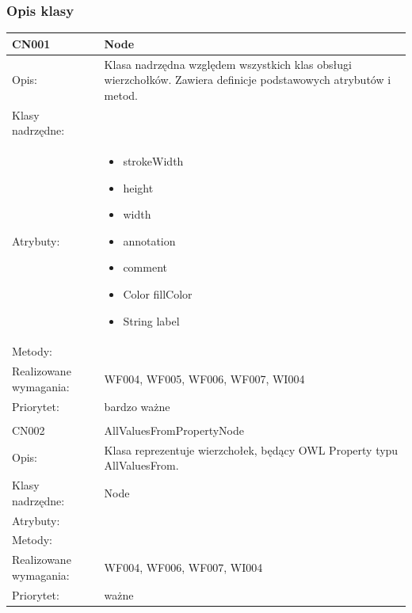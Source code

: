 \subsubsection{Opis klasy}

\begin{center}
 


\begin{longtable}{|m{3cm}|m{9cm}|} \hline

CN001 & Node \\ \hline
Opis: & Klasa nadrzędna względem wszystkich klas obsługi wierzchołków. Zawiera definicje podstawowych atrybutów i metod.    \\ \hline
Klasy nadrzędne: &     \\ \hline
Atrybuty: & \begin{itemize}
 \item strokeWidth
 \item height
 \item width
 \item annotation
 \item comment
\item Color fillColor
\item String label
\end{itemize}
 \\ \hline
Metody: &%
  \\ \hline
Realizowane wymagania: & WF004, WF005, WF006, WF007, WI004 \\ \hline
Priorytet: & bardzo ważne  \\ \hline

\multicolumn{2}{c}{} \\
 \hline

CN002 & AllValuesFromPropertyNode \\ \hline
Opis: & Klasa reprezentuje wierzchołek, będący OWL Property typu AllValuesFrom.    \\ \hline
Klasy nadrzędne: & Node     \\ \hline
Atrybuty: & 
 \\ \hline
Metody: & %
  \\ \hline
Realizowane wymagania: & WF004, WF006, WF007, WI004 \\ \hline
Priorytet: & ważne \\ \hline


\end{longtable}
\end{center}
